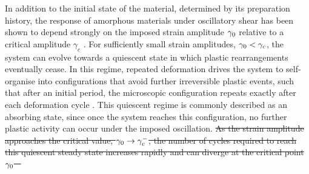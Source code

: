 \documentclass[asymmetricmargins]{library/duthesis}%
\newcommand{\DiffReportBodyFont}{\small}
\newcommand{\DiffReportLocationFont}{\large\bfseries}
\newcommand{\DiffReportMetaFont}{\small\ttfamily}
\newcommand{\DiffReportLocation}[1]{%
  \Needspace{4\baselineskip}%
  \par\medskip
  {\DiffReportLocationFont #1\par}
}
\newcommand{\DiffReportChange}[1]{%
  \Needspace{4\baselineskip}%
  \par\smallskip
  {\DiffReportMetaFont Change #1\par}
  \smallskip
}
\newenvironment{DiffReportContent}
  {\begingroup\DiffReportBodyFont}
  {\par\endgroup\medskip}
\providecommand{\DIFdel}[1]{{\protect\color{red}\sout{#1}}}                      %
\providecommand{\DIFdelbegin}{} %
\begin{document}
\begin{DiffReportContent}
In addition to the initial state of the material, determined by its preparation history, the response of amorphous materials under oscillatory shear has been shown to depend strongly on the imposed strain amplitude $\gamma_0$ relative to a critical amplitude $\gamma_c$ \cite{bhaumikRoleAnnealingDetermining2021,Cort2008,Das2020,Fiocco2013,kawasakiMacroscopicYieldingJammed2016,KhirallahIntegerModel2021,knowltonMicroscopicViewYielding2014,kumarMappingOutGlassy2022,lavrentovichPeriodProliferationPeriodic2017,bhardwajSituClickChemistry2017,liuFateShearoscillatedAmorphous2022,munganMetastabilityMechanismYielding2021,himanagamanasaExperimentalSignaturesNonequilibrium2014,nessAbsorbingStateTransitionsGranular2020,pineChaosThresholdIrreversibility2005,priezjevMolecularDynamicsSimulations2018,Regev_onset_2013,sastryModelsYieldingBehavior2021,szulcForcedDeterministicDynamics2020,yehGlassStabilityChanges2020}. For sufficiently small strain amplitudes, $\gamma_0 < \gamma_c$, the system can evolve towards a quiescent state in which plastic rearrangements eventually cease. In this regime, repeated deformation drives the system to self-organise into configurations that avoid further irreversible plastic events, such that after an initial period, the microscopic configuration repeats exactly after each deformation cycle \cite{Regev_onset_2013,kawasakiMacroscopicYieldingJammed2016,Leishangthem2017}. This quiescent regime is commonly described as an absorbing state, since once the system reaches this configuration, no further plastic activity can occur under the imposed oscillation. \DIFdelbegin %
\DIFdel{As the strain amplitude approaches the critical value, $\gamma_0\to\gamma_c^-$, the number of cycles required to reach this quiescent steady state increases rapidly and can diverge at the critical point $\gamma_0$ \mbox{%
\cite{Regev_onset_2013,kawasakiMacroscopicYieldingJammed2016}}\hskip0pt%
}
\end{DiffReportContent}
\end{document}
